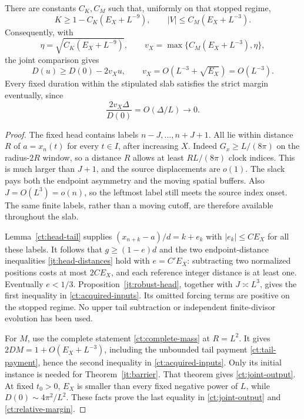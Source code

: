 \begin{theorem}
\label{ct:joint-acquisition}
There are constants $C_K,C_M$ such that, uniformly on that stopped
regime,
\begin{equation}
 K\ge1-C_K(E_X+L^{-9}),\qquad
 |V|\le C_M(E_X+L^{-3}).
 \label{ct:acquired-inputs}
\end{equation}
Consequently, with
\begin{equation}
 \eta=\sqrt{C_K(E_X+L^{-9})},\qquad
 v_X=\max\{C_M(E_X+L^{-3}),\eta\},
 \label{ct:barrier-parameter}
\end{equation}
the joint comparison gives
\begin{equation}
 D(u)\ge D(0)-2v_Xu,\qquad
 v_X=O(L^{-3}+\sqrt{E_X})=O(L^{-3}).
 \label{ct:joint-output}
\end{equation}
Every fixed duration within the stipulated slab satisfies the strict
margin eventually, since
\begin{equation}
 \frac{2v_X\Delta}{D(0)}=O(\Delta/L)\longrightarrow0.
 \label{ct:relative-margin}
\end{equation}
\end{theorem}

\begin{proof}
The fixed head contains labels $n-J,\ldots,n+J+1$. All lie within
distance $R$ of $a=x_n(t)$ for every $t\in I$, after increasing $X$.
Indeed $G_x\ge L/(8\pi)$ on the radius-$2R$ window, so a distance
$R$ allows at least $RL/(8\pi)$ clock indices. This is much larger
than $J+1$, and the source displacements are $o(1)$. The slack pays
both the endpoint asymmetry and the moving spatial buffers. Also
$J=O(L^3)=o(n)$, so the leftmost label still meets the source index
onset. The same finite labels, rather than a moving cutoff, are
therefore available throughout the slab.

Lemma~\ref{ct:head-tail} supplies
$(x_{n+k}-a)/d=k+e_k$ with $|e_k|\le CE_X$ for all these labels.
It follows that $g\ge(1-e)d$ and the two endpoint-distance
inequalities \eqref{jt:head-distances} hold with $e=C'E_X$:
subtracting two normalized positions costs at most $2CE_X$, and
each reference integer distance is at least one. Eventually $e<1/3$.
Proposition~\ref{jt:robust-head}, together with $J\asymp L^3$,
gives the first inequality in \eqref{ct:acquired-inputs}. Its omitted
forcing terms are positive on the stopped regime. No upper tail
subtraction or independent finite-divisor evolution has been used.

For $M$, use the complete statement \eqref{ct:complete-mass} at
$R=L^2$. It gives $2DM=1+O(E_X+L^{-3})$, including the unbounded
tail payment \eqref{ct:tail-payment}, hence the second inequality
in \eqref{ct:acquired-inputs}. Only its initial instance is needed
for Theorem~\ref{jt:barrier}. That theorem gives
\eqref{ct:joint-output}. At fixed $t_0>0$, $E_X$ is smaller than
every fixed negative power of $L$, while
$D(0)\sim4\pi^2/L^2$. These facts prove the last equality in
\eqref{ct:joint-output} and \eqref{ct:relative-margin}.
\end{proof}

